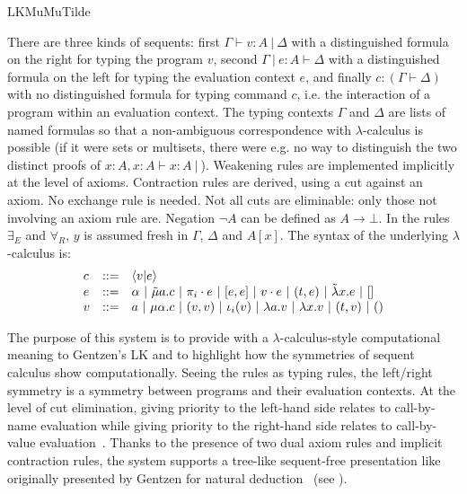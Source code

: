 \begin{entry}{LKMuMuTilde}
\begin{calculus}
\end{calculus}
\begin{clarifications}
There are three kinds of sequents: first $\Gamma \vdash v:A ~|~
\Delta$ with a distinguished formula on the right for typing the
program $v$, second $\Gamma ~|~ e:A \vdash \Delta$ with a
distinguished formula on the left for typing the evaluation context
$e$, and finally $c : (\Gamma \vdash \Delta)$ with no distinguished
formula for typing command $c$, i.e. the interaction of a program
within an evaluation context. The typing contexts $\Gamma$ and
$\Delta$ are lists of named formulas so that a non-ambiguous
correspondence with $\lambda$-calculus is possible (if it were sets or
multisets, there were e.g. no way to distinguish the two distinct
proofs of $x:A, x:A \vdash x:A ~|~$). Weakening rules are implemented
implicitly at the level of axioms. Contraction rules are derived,
using a cut against an axiom. No exchange rule is needed.  Not all
cuts are eliminable: only those not involving an axiom rule are.
Negation $\neg A$ can be defined as $A \rightarrow \bot$. In the rules
$\exists_E$ and $\forall_R$, $y$ is assumed fresh in $\Gamma$,
$\Delta$ and $A[x]$. The syntax of the underlying $\lambda$-calculus
is:
$$
\begin{array}{lll}
c & ::= & \langle v | e \rangle\\
e & ::= & \alpha ~|~ \tilde\mu a.c ~|~ \pi_i\cdot e ~|~ [e,e] ~|~ v \cdot e ~|~ (t,e) ~|~ \tilde\lambda x.e ~|~ []\\
v & ::= & a ~|~ \mu\alpha.c ~|~ (v,v) ~|~ \iota_i(v) ~|~ \lambda a.v ~|~ \lambda x.v ~|~ (t,v) ~|~ ()\\
\end{array}
$$
\end{clarifications}

\begin{history}
The purpose of this system is to provide with a
$\lambda$-calculus-style computational meaning to Gentzen's LK
 and to highlight how the symmetries of sequent
calculus show computationally. Seeing the rules as typing rules, the
left/right symmetry is a symmetry between programs and their
evaluation contexts. At the level of cut elimination, giving priority
to the left-hand side relates to call-by-name evaluation while giving
priority to the right-hand side relates to call-by-value
evaluation~\cite{CurienHerbelin00}. Thanks to the presence of two dual
axiom rules and implicit contraction rules, the system supports a
tree-like sequent-free presentation like originally presented by
Gentzen for natural deduction~\cite{HerbelinHdR} (see
).


\end{history}
\end{entry}
